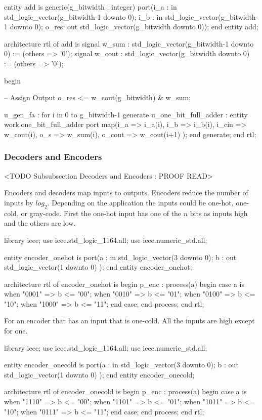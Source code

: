 \begin{VHDLlisting}[tabsize=8]
entity add is
generic(g_bitwidth : integer)
port(i_a  : in    std_logic_vector(g_bitwidth-1 downto 0);  
     i_b  : in    std_logic_vector(g_bitwidth-1 downto 0);  
	 o_res:   out std_logic_vector(g_bitwidth downto 0));
end entity add;

architecture rtl of add is 
	signal w_sum  : std_logic_vector(g_bitwidth-1 downto 0) := (others => '0'); 
	signal w_cout : std_logic_vector(g_bitwidth downto 0) := (others => '0');
	
begin 

	-- Assign Output 
	o_res <= w_cout(g_bitwidth) & w_sum; 
	
	u_gen_fa : for i in 0 to g_bitwidth-1 generate  
		u_one_bit_full_adder : entity work.one_bit_full_adder  
		port map(i_a    => i_a(i),
				 i_b    => i_b(i),
				 i_cin  => w_cout(i),
				 o_s    => w_sum(i),
				 o_cout => w_cout(i+1)
        );  
	end generate;
end rtl;
\end{VHDLlisting}


	
\subsubsection{Decoders and Encoders}
	<TODO Subsubsection  Decoders and Encoders : PROOF READ>
	
Encoders and decoders map inputs to outputs. Encoders reduce the number of inputs by $log_2$. Depending on the application the inputs could be one-hot, one-cold, or gray-code. First the one-hot input has one of the $n$ bits as inputs high and the others are low.

\begin{VHDLlisting}[tabsize=8]
library ieee;
  use ieee.std_logic_1164.all;
  use ieee.numeric_std.all;
  
entity encoder_onehot is
port(a : in    std_logic_vector(3 downto 0);
     b :   out std_logic_vector(1 downto 0)
);
end entity encoder_onehot;

architecture rtl of encoder_onehot is
begin
	p_enc : process(a)
	begin
		case a is	
			when "0001" => 
				b <= "00";
			when "0010" => 
				b <= "01";
			when "0100" => 
				b <= "10";
			when "1000" => 
				b <= "11";
		end case;
	end process;
end rtl;
\end{VHDLlisting}

For an encoder that has an input that is one-cold. All the inputs are high except for one. 

\begin{VHDLlisting}[tabsize=8]
library ieee;
  use ieee.std_logic_1164.all;
  use ieee.numeric_std.all;
  
entity encoder_onecold is
port(a : in    std_logic_vector(3 downto 0);
     b :   out std_logic_vector(1 downto 0)
);
end entity encoder_onecold;

architecture rtl of encoder_onecold is
begin
	p_enc : process(a)
	begin
		case a is	
			when "1110" => 
				b <= "00";
			when "1101" => 
				b <= "01";
			when "1011" => 
				b <= "10";
			when "0111" => 
				b <= "11";
		end case;
	end process;
end rtl;
\end{VHDLlisting}
	
